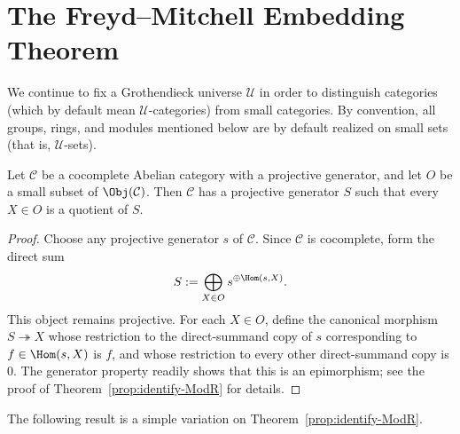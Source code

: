 
\section{The Freyd--Mitchell Embedding Theorem}\label{sec:FM}
We continue to fix a Grothendieck universe $\mathcal{U}$ in order to distinguish categories (which by default mean $\mathcal{U}$-categories) from small categories. By convention, all groups, rings, and modules mentioned below are by default realized on small sets (that is, $\mathcal{U}$-sets).

\begin{lemma}\label{prop:FM-prep-1}
	Let $\mathcal{C}$ be a cocomplete Abelian category with a projective generator, and let $O$ be a small subset of $\Obj(\mathcal{C})$. Then $\mathcal{C}$ has a projective generator $S$ such that every $X\in O$ is a quotient of $S$.
\end{lemma}
\begin{proof}
	Choose any projective generator $s$ of $\mathcal{C}$. Since $\mathcal{C}$ is cocomplete, form the direct sum
	\[ S := \bigoplus_{X \in O} s^{\oplus \Hom(s, X)}. \]
	This object remains projective. For each $X\in O$, define the canonical morphism $S\twoheadrightarrow X$ whose restriction to the direct-summand copy of $s$ corresponding to $f\in\Hom(s,X)$ is $f$, and whose restriction to every other direct-summand copy is $0$. The generator property readily shows that this is an epimorphism; see the proof of Theorem~\ref{prop:identify-ModR} for details.
\end{proof}

The following result is a simple variation on Theorem~\ref{prop:identify-ModR}.

